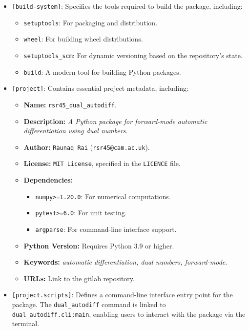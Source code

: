 \documentclass[a4paper,12pt]{article}
\begin{document}
    \begin{itemize}
        \item \texttt{[build-system]}: Specifies the tools required to build the package, including:
        \begin{itemize}
            \item \texttt{setuptools}: For packaging and distribution.
            \item \texttt{wheel}: For building wheel distributions.
            \item \texttt{setuptools\_scm}: For dynamic versioning based on the repository's state.
            \item \texttt{build}: A modern tool for building Python packages.
        \end{itemize}
    
        \item \texttt{[project]}: Contains essential project metadata, including:
        \begin{itemize}
            \item \textbf{Name:} \texttt{rsr45\_dual\_autodiff}.
            \item \textbf{Description:} \textit{A Python package for forward-mode automatic differentiation using dual numbers}.
            \item \textbf{Author:} \texttt{Raunaq Rai} (\texttt{rsr45@cam.ac.uk}).
            \item \textbf{License:} \texttt{MIT License}, specified in the \texttt{LICENCE} file.
            \item \textbf{Dependencies:} 
            \begin{itemize}
                \item \texttt{numpy>=1.20.0}: For numerical computations.
                \item \texttt{pytest>=6.0}: For unit testing.
                \item \texttt{argparse}: For command-line interface support.
            \end{itemize}
            \item \textbf{Python Version:} Requires Python 3.9 or higher.
            \item \textbf{Keywords:} \textit{automatic differentiation, dual numbers, forward-mode}.
            \item \textbf{URLs:} Link to the gitlab repository.
        \end{itemize}
    
        \item \texttt{[project.scripts]}: Defines a command-line interface entry point for the package. The \texttt{dual\_autodiff} command is linked to \texttt{dual\_autodiff.cli:main}, enabling users to interact with the package via the terminal.
    \end{itemize}
    
\end{document}
